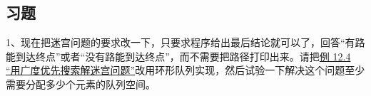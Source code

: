\subsection*{习题}
%


1、现在把迷宫问题的要求改一下，只要求程序给出最后结论就可以了，回答“有路能到达终点”或者“没有路能到达终点”，而不需要把路径打印出来。请把\hyperlink{db.ch12s04.id2750660}{例 12.\BookSplit{}4 “用广度优先搜索解迷宫问题”}改用环形队列实现，然后试验一下解决这个问题至少需要分配多少个元素的队列空间。

